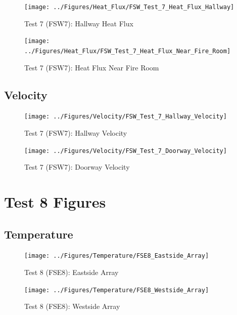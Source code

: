 \documentclass[12pt,oneside]{book}
\begin{document}
\begin{figure}[!ht]
	\texttt{[image: ../Figures/Heat\_Flux/FSW\_Test\_7\_Heat\_Flux\_Hallway]}
	\caption{Test 7 (FSW7): Hallway Heat Flux}
	\label{fig:Test_7_Hallway_Heat_Flux}
\end{figure}

\begin{figure}[!ht]
	\texttt{[image: ../Figures/Heat\_Flux/FSW\_Test\_7\_Heat\_Flux\_Near\_Fire\_Room]}
	\caption{Test 7 (FSW7): Heat Flux Near Fire Room}
	\label{fig:Test_7_Heat_Flux_Near_Fire_Room}
\end{figure}

\subsection{Velocity}
\label{subsec:Velocity}

\begin{figure}[!ht]
	\texttt{[image: ../Figures/Velocity/FSW\_Test\_7\_Hallway\_Velocity]}
	\caption{Test 7 (FSW7): Hallway Velocity}
	\label{fig:Test_7_Hallway_Velocity}
\end{figure}

\begin{figure}[!ht]
	\texttt{[image: ../Figures/Velocity/FSW\_Test\_7\_Doorway\_Velocity]}
	\caption{Test 7 (FSW7): Doorway Velocity}
	\label{fig:Test_7_Doorway_Velocity}
\end{figure}

\clearpage

\section{Test 8 Figures}
\label{subsec:Test_8_Figures}

\subsection{Temperature}
\label{subsec:Temperature}

\begin{figure}[!ht]
	\texttt{[image: ../Figures/Temperature/FSE8\_Eastside\_Array]}
	\caption{Test 8 (FSE8): Eastside Array}
	\label{fig:Test_8_Eastside_Array}
\end{figure}

\begin{figure}[!ht]
	\texttt{[image: ../Figures/Temperature/FSE8\_Westside\_Array]}
	\caption{Test 8 (FSE8): Westside Array}
	\label{fig:Test_8_Westside_Array}
\end{figure}
\end{document}
